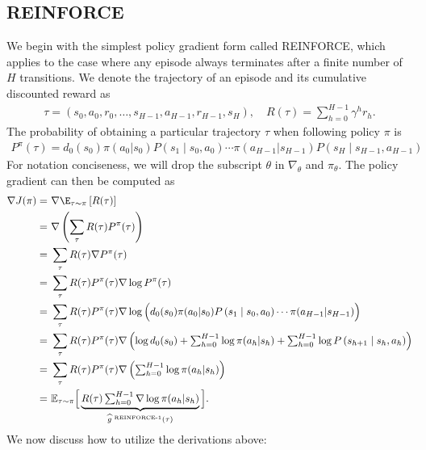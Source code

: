 \subsection{REINFORCE}
We begin with the simplest policy gradient form called REINFORCE, which applies to the case where any episode always terminates after a finite number of $H$ transitions. We denote the trajectory of an episode and its cumulative discounted reward as 
\begin{align*}
    \tau = (s_0, a_0, r_0, \ldots, s_{H-1}, a_{H-1}, r_{H-1}, s_H),\quad
    R(\tau) = \textstyle \sum_{h=0}^{H-1}\gamma^hr_h
    .
\end{align*}
The probability of obtaining a particular trajectory $\tau$ when following policy $\pi$ is
\begin{align*}
    P^\pi(\tau) = d_0(s_0) \pi(a_0 | s_0) P\left(s_1 \mid s_0, a_0\right) \cdots \pi(a_{H-1} | s_{H-1})  P\left(s_{H} \mid s_{H-1}, a_{H-1}\right)
\end{align*}
For notation conciseness, we will drop the subscript $\theta$ in $\nabla_\theta$ and $\pi_\theta$.
The policy gradient can then be computed as 
\begin{align}
\nabla J(\pi) =&~ \nabla \E_{\tau\sim\pi}\left[R(\tau)\right] \nonumber\\
=&~ \nabla \left(\sum_{\tau} R(\tau) P^\pi(\tau)\right)\nonumber\\
=&~\sum_\tau R(\tau) \nabla P^\pi(\tau) \nonumber\\
=&~\sum_\tau R(\tau) P^\pi(\tau) \nabla \log P^\pi(\tau)  \nonumber\\
=&~\sum_\tau R(\tau) P^\pi(\tau) \nabla \log \Big(d_0(s_0) \pi(a_0 | s_0) P\left(s_1 \mid s_0, a_0\right) \cdots \pi(a_{H-1} | s_{H-1})\Big) \nonumber\\
=&~\sum_\tau R(\tau) P^\pi(\tau) \textstyle\nabla\left(\log d_0(s_0)+\sum_{h=0}^{H-1} \log \pi(a_h | s_h)+\sum_{h=0}^{H-1} \log P\left(s_{h+1} \mid s_h, a_h\right)\right) \nonumber\\
=&~\sum_\tau R(\tau) P^\pi(\tau) \textstyle\nabla\left(\sum_{h=0}^{H-1} \log \pi(a_h | s_h)\right) \label{eq:PG_REINFORCE}\\ 
=&~\mathbb{E}_{\tau \sim \pi}\Big[\underbrace{R(\tau) \textstyle\sum_{h=0}^{H-1} \nabla \log \pi(a_h | s_h)}_{\widehat{g}^{\text{ REINFORCE-1}}(\tau)}\Big]
\label{eq:REINFORCE-1}
.
\end{align}
We now discuss how to utilize the derivations above:
